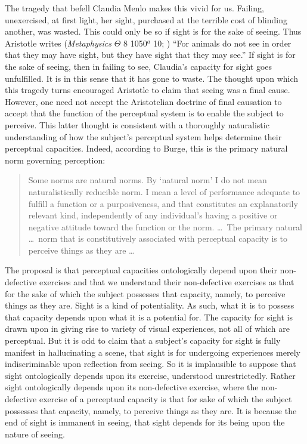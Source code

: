 \documentclass[12pt]{article}
\begin{document}
The tragedy that befell Claudia Menlo makes this vivid for us. Failing, unexercised, at first light, her sight, purchased at the terrible cost of blinding another, was wasted. This could only be so if sight is for the sake of seeing. Thus Aristotle writes (\emph{Metaphysics} \( \Theta \) 8 1050\( ^{a} \) 10; \citealt{Barnes:1984kx}) ``For animals do not see in order that they may have sight, but they have sight that they may see.'' If sight is for the sake of seeing, then in failing to see, Claudia's capacity for sight goes unfulfilled. It is in this sense that it has gone to waste. The thought upon which this tragedy turns encouraged Aristotle to claim that seeing was a final cause. However, one need not accept the Aristotelian doctrine of final causation to accept that the function of the perceptual system is to enable the subject to perceive. This latter thought is consistent with a thoroughly naturalistic understanding of how the subject's perceptual system helps determine their perceptual capacities. Indeed, according to Burge, this is the primary natural norm governing perception:
\begin{quote}
	Some norms are natural norms. By ‘natural norm’ I do not mean naturalistically reducible norm. I mean a level of performance adequate to fulfill a function or a purposiveness, and that constitutes an explanatorily relevant kind, independently of any individual’s having a positive or negative attitude toward the function or the norm. \ldots\ The primary natural \dots\ norm that is constitutively associated with perceptual capacity is to perceive things as they are \ldots\ \citep[311--312]{Burge:2010uq}
\end{quote}

The proposal is that perceptual capacities ontologically depend upon their non-defective exercises and that we understand their non-defective exercises as that for the sake of which the subject possesses that capacity, namely, to perceive things as they are. Sight is a kind of potentiality. As such, what it is to possess that capacity depends upon what it is a potential for. The capacity for sight is drawn upon in giving rise to variety of visual experiences, not all of which are perceptual. But it is odd to claim that a subject's capacity for sight is fully manifest in hallucinating a scene, that sight is for undergoing experiences merely indiscriminable upon reflection from seeing. So it is implausible to suppose that sight ontologically depends upon its exercise, understood unrestrictedly. Rather sight ontologically depends upon its non-defective exercise, where the non-defective exercise of a perceptual capacity is that for sake of which the subject possesses that capacity, namely, to perceive things as they are. It is because the end of sight is immanent in seeing, that sight depends for its being upon the nature of seeing.
\end{document}
